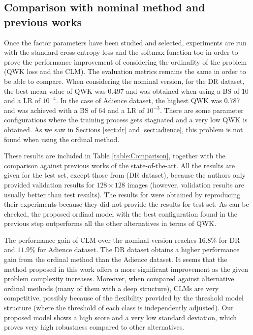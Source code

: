 \documentclass[preprint]{elsarticle}
\begin{document}
\subsection{Comparison with nominal method and previous works}
\label{sect:NominalComparison}
Once the factor parameters have been studied and selected, experiments are run with the standard cross-entropy loss and the softmax function too in order to prove the performance improvement of considering the ordinality of the problem (QWK loss and the CLM). The evaluation metrics remains the same in order to be able to compare. When considering the nominal version, for the DR dataset, the best mean value of QWK was $0.497$ and was obtained when using a BS of 10 and a LR of $10^{-4}$. In the case of Adience dataset, the highest QWK was $0.787$ and was achieved with a BS of 64 and a LR of $10^{-3}$. There are some parameter configurations where the training process gets stagnated and a very low QWK is obtained. As we saw in Sections \ref{sect:dr} and \ref{sect:adience}, this problem is not found when using the ordinal method. 

These results are included in Table \ref{table:Comparison}, together with the comparison against previous works of the state-of-the-art. All the results are given for the test set, except those from \cite{de2018weighted} (DR dataset), because the authors only provided validation results for $128\times 128$ images (however, validation results are usually better than test results). The results for \cite{beckham2017unimodal} were obtained by reproducing their experiments because they did not provide the results for test set. As can be checked, the proposed ordinal model with the best configuration found in the previous step outperforms all the other alternatives in terms of QWK. 

The performance gain of CLM over the nominal version reaches $16.8\%$ for DR and $11.9\%$ for Adience dataset. The DR dataset obtains a higher performance gain from the ordinal method than the Adience dataset. It seems that the method proposed in this work offers a more significant improvement as the given problem complexity increases. Moreover, when compared against alternative ordinal methods (many of them with a deep structure), CLMs are very competitive, possibly because of the flexibility provided by the threshold model structure (where the threshold of each class is independently adjusted). Our proposed model shows a high score and a very low standard deviation, which proves very high robustness compared to other alternatives.
\end{document}
